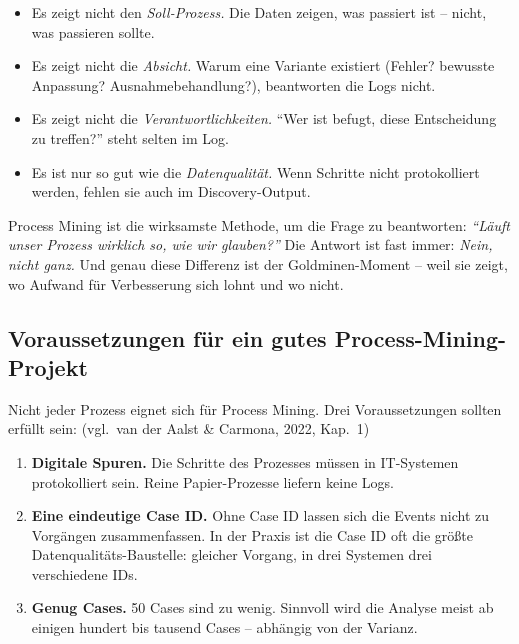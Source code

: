 \documentclass[11pt,a4paper,oneside]{article}
\newcommand{\quelle}[1]{{\footnotesize\color{lpGray}(#1)}}
\begin{document}
\begin{itemize}
  \item Es zeigt nicht den \emph{Soll-Prozess.} Die Daten zeigen, was passiert ist -- nicht, was passieren sollte.
  \item Es zeigt nicht die \emph{Absicht.} Warum eine Variante existiert (Fehler? bewusste Anpassung? Ausnahmebehandlung?), beantworten die Logs nicht.
  \item Es zeigt nicht die \emph{Verantwortlichkeiten.} ``Wer ist befugt, diese Entscheidung zu treffen?'' steht selten im Log.
  \item Es ist nur so gut wie die \emph{Datenqualität.} Wenn Schritte nicht protokolliert werden, fehlen sie auch im Discovery-Output.
\end{itemize}

\begin{merkbox}
Process Mining ist die wirksamste Methode, um die Frage zu beantworten: \emph{``Läuft unser Prozess wirklich so, wie wir glauben?''} Die Antwort ist fast immer: \emph{Nein, nicht ganz.} Und genau diese Differenz ist der Goldminen-Moment -- weil sie zeigt, wo Aufwand für Verbesserung sich lohnt und wo nicht.
\end{merkbox}

\subsection{Voraussetzungen für ein gutes Process-Mining-Projekt}

Nicht jeder Prozess eignet sich für Process Mining. Drei Voraussetzungen sollten erfüllt sein: \quelle{vgl.\ van der Aalst \& Carmona, 2022, Kap.~1}

\begin{enumerate}
  \item \textbf{Digitale Spuren.} Die Schritte des Prozesses müssen in IT-Systemen protokolliert sein. Reine Papier-Prozesse liefern keine Logs.
  \item \textbf{Eine eindeutige Case ID.} Ohne Case ID lassen sich die Events nicht zu Vorgängen zusammenfassen. In der Praxis ist die Case ID oft die größte Datenqualitäts-Baustelle: gleicher Vorgang, in drei Systemen drei verschiedene IDs.
  \item \textbf{Genug Cases.} 50 Cases sind zu wenig. Sinnvoll wird die Analyse meist ab einigen hundert bis tausend Cases -- abhängig von der Varianz.
\end{enumerate}
\end{document}
